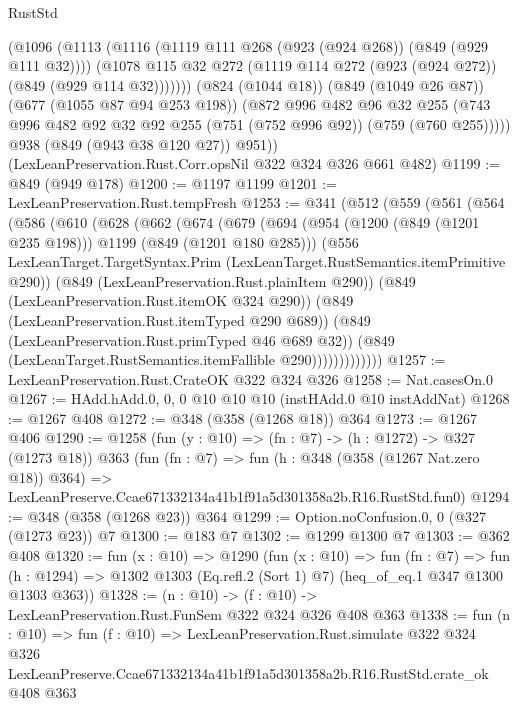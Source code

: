 \begin{lexlean}{RustStd}
\begin{coremodule}
            (@1096
              (@1113
                (@1116 (@1119 @111 @268 (@923 (@924 @268)) (@849 (@929 @111 @32))))
                (@1078 @115 @32 @272 (@1119 @114 @272 (@923 (@924 @272)) (@849 (@929 @114 @32)))))))
          (@824 (@1044 @18))
          (@849 (@1049 @26 @87))
          (@677 (@1055 @87 @94 @253 @198))
          (@872
            @996
            @482
            @96
            @32
            @255
            (@743 @996 @482 @92 @32 @92 @255 (@751 (@752 @996 @92)) (@759 (@760 @255)))))
        @938
        (@849 (@943 @38 @120 @27))
        @951))
    (LexLeanPreservation.Rust.Corr.opsNil @322 @324 @326 @661 @482)
@1199 := @849 (@949 @178)
@1200 := @1197 @1199
@1201 := LexLeanPreservation.Rust.tempFresh
@1253 := @341
    (@512
      (@559
        (@561
          (@564
            (@586
              (@610
                (@628
                  (@662
                    (@674
                      (@679
                        (@694
                          (@954 (@1200 (@849 (@1201 @235 @198))) @1199 (@849 (@1201 @180 @285)))
                          (@556
                            LexLeanTarget.TargetSyntax.Prim
                            (LexLeanTarget.RustSemantics.itemPrimitive @290))
                          (@849 (LexLeanPreservation.Rust.plainItem @290))
                          (@849 (LexLeanPreservation.Rust.itemOK @324 @290))
                          (@849 (LexLeanPreservation.Rust.itemTyped @290 @689))
                          (@849 (LexLeanPreservation.Rust.primTyped @46 @689 @32))
                          (@849 (LexLeanTarget.RustSemantics.itemFallible @290)))))))))))))
@1257 := LexLeanPreservation.Rust.CrateOK @322 @324 @326
@1258 := Nat.casesOn.{0}
@1267 := HAdd.hAdd.{0, 0, 0} @10 @10 @10 (instHAdd.{0} @10 instAddNat)
@1268 := @1267 @408
@1272 := @348 (@358 (@1268 @18)) @364
@1273 := @1267 @406
@1290 := @1258
    (fun (y : @10) => (fn : @7) -> (h : @1272) -> @327 (@1273 @18))
    @363
    (fun (fn : @7) =>
    fun (h : @348 (@358 (@1267 Nat.zero @18)) @364) =>
    LexLeanPreserve.Ccae671332134a41b1f91a5d301358a2b.R16.RustStd.fun0)
@1294 := @348 (@358 (@1268 @23)) @364
@1299 := Option.noConfusion.{0, 0} (@327 (@1273 @23)) @7
@1300 := @183 @7
@1302 := @1299 @1300 @7
@1303 := @362 @408
@1320 := fun (x : @10) =>
  @1290
    (fun (x : @10) =>
    fun (fn : @7) =>
    fun (h : @1294) => @1302 @1303 (Eq.refl.{2} (Sort 1) @7) (heq_of_eq.{1} @347 @1300 @1303 @363))
@1328 := (n : @10) -> (f : @10) -> LexLeanPreservation.Rust.FunSem @322 @324 @326 @408 @363
@1338 := fun (n : @10) =>
  fun (f : @10) =>
  LexLeanPreservation.Rust.simulate
    @322
    @324
    @326
    LexLeanPreserve.Ccae671332134a41b1f91a5d301358a2b.R16.RustStd.crate_ok
    @408
    @363
\end{coremodule}
\end{lexlean}
